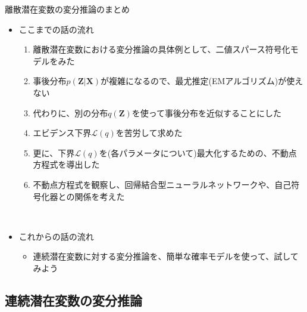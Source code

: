 \documentclass[dvipdfmx,notheorems,t]{beamer}
\begin{document}
\begin{frame}{離散潜在変数の変分推論のまとめ}

\begin{itemize}
	\item ここまでの話の流れ
	\begin{enumerate}
		\item 離散潜在変数における変分推論の具体例として、二値スパース符号化モデルをみた
		\newline
		\item 事後分布$p(\bm{Z} | \bm{X})$が複雑になるので、最尤推定(EMアルゴリズム)が使えない
		\item 代わりに、別の分布$q(\bm{Z})$を使って事後分布を近似することにした
		\newline
		\item エビデンス下界$\mathcal{L}(q)$を\alert{苦労して求めた}
		\item 更に、下界$\mathcal{L}(q)$を(各パラメータについて)最大化するための、不動点方程式を導出した
		\newline
		\item 不動点方程式を観察し、回帰結合型ニューラルネットワークや、自己符号化器との関係を考えた
	\end{enumerate} \
	
	\item これからの話の流れ
	\begin{itemize}
		\item 連続潜在変数に対する変分推論を、簡単な確率モデルを使って、試してみよう
	\end{itemize}
\end{itemize}

\end{frame}

\subsection{連続潜在変数の変分推論}
\end{document}
